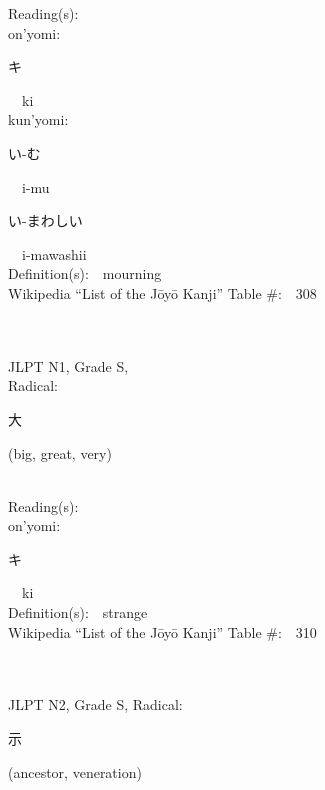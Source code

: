 \begin{multicols}{2}
Reading(s):\ \ \\
{\hspace*{1em}}on'yomi:\ \ \\
{\hspace*{2em}}{\begin{CJK}{UTF8}{min} キ \end{CJK}}\ \ ki\ \ \\
{\hspace*{1em}}kun'yomi:\ \ \\
{\hspace*{2em}}{\begin{CJK}{UTF8}{min} い-む \end{CJK}}\ \ i-mu\ \ \\
{\hspace*{2em}}{\begin{CJK}{UTF8}{min} い-まわしい \end{CJK}}\ \ i-mawashii\ \ \\
Definition(s):\ \ mourning \\
Wikipedia ``List of the J\=oy\=o Kanji'' Table \#:\ \ 308 \\
\ \ \\
{\fontsize{34pt}{40pt}  }\ \ \\
{JLPT N1, Grade S, \\Radical:\ \ {\begin{CJK}{UTF8}{min} 大 \end{CJK}} (big, great, very) } \\
Reading(s):\ \ \\
{\hspace*{1em}}on'yomi:\ \ \\
{\hspace*{2em}}{\begin{CJK}{UTF8}{min} キ \end{CJK}}\ \ ki\ \ \\
Definition(s):\ \ strange \\
Wikipedia ``List of the J\=oy\=o Kanji'' Table \#:\ \ 310 \\
\ \ \\
{\fontsize{34pt}{40pt}  }\ \ \\  %
{JLPT N2, Grade S, Radical:\ \ {\begin{CJK}{UTF8}{min} 示 \end{CJK}} (ancestor, veneration) } \\

\end{multicols}
